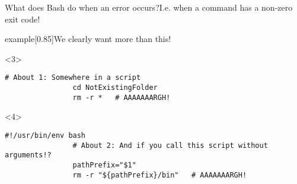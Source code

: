 \begin{frame}[fragile]{What does Bash do when an error occurs?}{I.e. when a command has a non-zero exit code!}
\begin{overlayarea}{\textwidth}{0.7\textheight}
\begin{varblock}{example}[0.85\textwidth]{We clearly want more than this!}
        \end{varblock}
        \begin{onlyenv}<3>
            \begin{lstlisting}[style=myBash, numbers=none, aboveskip=3mm]
                # About 1: Somewhere in a script
                cd NotExistingFolder
                rm -r *   # AAAAAAARGH!
            \end{lstlisting}
        \end{onlyenv}
        \begin{onlyenv}<4>
            \begin{lstlisting}[style=myBash, numbers=none, aboveskip=3mm]
                #!/usr/bin/env bash
                # About 2: And if you call this script without arguments!?
                pathPrefix="$1"
                rm -r "${pathPrefix}/bin"   # AAAAAAARGH!
            \end{lstlisting}
        \end{onlyenv}
    \end{overlayarea}
\end{frame}
